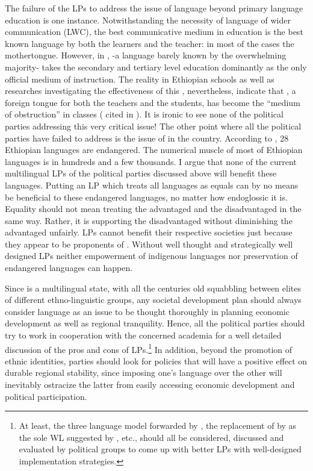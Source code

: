 \documentclass[output=paper,modfonts]{langscibook}
\begin{document}
The failure of the LPs to address the issue of language beyond primary language education is one instance. Notwithstanding the necessity of language of wider communication (LWC), the best communicative medium in education is the best known language by both the learners and the teacher: in most of the cases the mothertongue. However, in ,  -a language barely known by the overwhelming majority- takes the secondary and tertiary level education dominantly as the only official medium of instruction. The reality in Ethiopian schools as well as researches investigating the effectiveness of this , nevertheless, indicate that , a foreign tongue for both the teachers and the students, has become the “medium of obstruction” in classes (\citealt{Stodart1986} cited in \citealt{BerhanuEtAl2009}). It is ironic to see none of the political parties addressing this very critical issue! The other point where all the political parties have failed to address is the issue of  in the country. According to \citet{UNESCO2015}, 28 Ethiopian languages are endangered. The numerical muscle of most of Ethiopian languages is in hundreds and a few thousands. I argue that none of the current multilingual LPs of the political parties discussed above will benefit these languages. Putting an LP which treats all languages as equals can by no means be beneficial to these endangered languages, no matter how endoglossic it is. Equality should not mean treating the advantaged and the disadvantaged in the same way. Rather, it is supporting the disadvantaged without diminishing the advantaged unfairly.  LPs cannot benefit their respective societies just because they appear to be proponents of . Without well thought and strategically well designed LPs neither empowerment of indigenous languages nor preservation of endangered languages can happen.      

\newpage 
Since  is a multilingual state, with all the centuries old squabbling between elites of different ethno-linguistic groups, any societal development plan should always consider language as an issue to be thought thoroughly in planning economic development as well as regional tranquility. Hence, all the political parties should try to work in cooperation with the concerned academia for a well detailed discussion of the pros and cons of LPs.\footnote{At least, the three language model forwarded by \citet{Wodajo2014}, the replacement of  by  as the sole WL suggested by \citet{Gebreselassie2015}, etc., should all be considered, discussed and evaluated by political groups to come up with better LPs with well-designed implementation strategies.} In addition, beyond the promotion of ethnic identities, parties should look for policies that will have a positive effect on durable regional stability, since imposing one’s language over the other will inevitably ostracize the latter from easily accessing economic development and political participation. 
\end{document}

